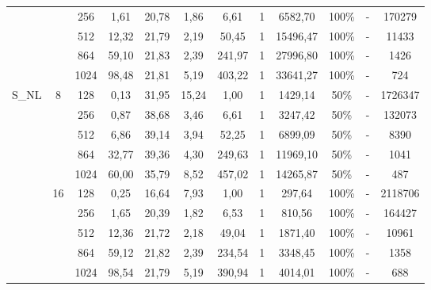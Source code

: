 \documentclass[10pt,a4paper]{article}
\begin{document}
\begin{center}
\begin{tabular}{ |c|c|c|c|c|c|c|c|c|c|c|c| }
		                        &                     & 256  & 1,61   & 20,78  & 1,86   & 6,61       & 1      & 6582,70  & 100\% & - & 170279  \\ \cline{3-12}
		                        &                     & 512  & 12,32  & 21,79  & 2,19   & 50,45      & 1      & 15496,47 & 100\% & - & 11433   \\ \cline{3-12}
		                        &                     & 864  & 59,10  & 21,83  & 2,39   & 241,97     & 1      & 27996,80 & 100\% & - & 1426    \\ \cline{3-12}
		                        &                     & 1024 & 98,48  & 21,81  & 5,19   & 403,22     & 1      & 33641,27 & 100\% & - & 724     \\ \cline{1-12}
		\multirow{10}{*}{S\_NL} & \multirow{5}{*}{8}  & 128  & 0,13   & 31,95  & 15,24  & 1,00       & 1      & 1429,14  & 50\%  & - & 1726347 \\ \cline{3-12}
		                        &                     & 256  & 0,87   & 38,68  & 3,46   & 6,61       & 1      & 3247,42  & 50\%  & - & 132073  \\ \cline{3-12}
		                        &                     & 512  & 6,86   & 39,14  & 3,94   & 52,25      & 1      & 6899,09  & 50\%  & - & 8390    \\ \cline{3-12}
		                        &                     & 864  & 32,77  & 39,36  & 4,30   & 249,63     & 1      & 11969,10 & 50\%  & - & 1041    \\ \cline{3-12}
		                        &                     & 1024 & 60,00  & 35,79  & 8,52   & 457,02     & 1      & 14265,87 & 50\%  & - & 487     \\ \cline{2-12}
		                        & \multirow{5}{*}{16} & 128  & 0,25   & 16,64  & 7,93   & 1,00       & 1      & 297,64   & 100\% & - & 2118706 \\ \cline{3-12}
		                        &                     & 256  & 1,65   & 20,39  & 1,82   & 6,53       & 1      & 810,56   & 100\% & - & 164427  \\ \cline{3-12}
		                        &                     & 512  & 12,36  & 21,72  & 2,18   & 49,04      & 1      & 1871,40  & 100\% & - & 10961   \\ \cline{3-12}
		                        &                     & 864  & 59,12  & 21,82  & 2,39   & 234,54     & 1      & 3348,45  & 100\% & - & 1358    \\ \cline{3-12}
		                        &                     & 1024 & 98,54  & 21,79  & 5,19   & 390,94     & 1      & 4014,01  & 100\% & - & 688     \\ \cline{1-12}
	\end{tabular}
\end{center}
\end{document}
